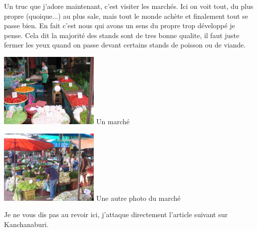 \begin{multicols}{2}
Un truc que j'adore maintenant, c'est visiter les marchés. Ici on voit tout, du plus propre (quoique...) au plus sale, mais tout le monde achète et finalement tout se passe bien. En fait c'est nous qui avons un sens du propre trop développé je pense. Cela dit la majorité des stands sont de tres bonne qualite, il faut juste fermer les yeux quand on passe devant certains stands de poisson ou de viande.

\hspace*{-0.65cm}
\includegraphics[width=4.8cm]{articles/Bangkok/1384.jpg}
Un marché

\hspace*{-0.65cm}
\includegraphics[width=4.8cm]{articles/Bangkok/1387.jpg}
Une autre photo du marché


Je ne vous dis pas au revoir ici, j'attaque directement l'article suivant sur Kanchanaburi.

\end{multicols}
